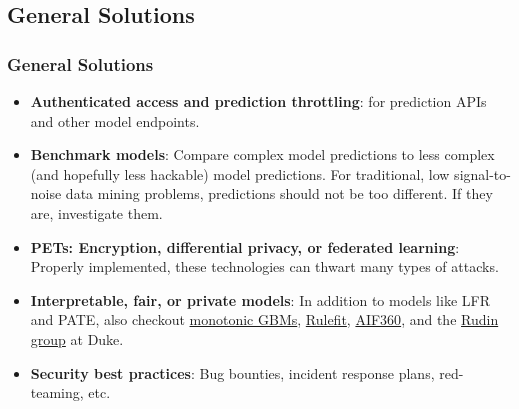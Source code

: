 \documentclass[11pt,
               aspectratio=169,
               hyperref={colorlinks}
               ]{beamer}
\begin{document}
		\subsection{General Solutions}
	
			\begin{frame}[t]	
		
				\frametitle{General Solutions}	
				\scriptsize
				\small
				\begin{itemize}
					\item \textbf{Authenticated access and prediction throttling}: for prediction APIs and other model endpoints.
					\item \textbf{Benchmark models}: Compare complex model predictions to less complex (and hopefully less hackable) model predictions. For traditional, low signal-to-noise data mining problems, predictions should not be too different. If they are, investigate them.
					\item \textbf{PETs: Encryption, differential privacy, or federated learning}: Properly implemented, these technologies can thwart many types of attacks.
					\item \textbf{Interpretable, fair, or private models}: In addition to models like LFR and PATE, also checkout \href{https://github.com/h2oai/h2o-3/blob/master/h2o-py/demos/H2O_tutorial_gbm_monotonicity.ipynb}{monotonic GBMs}, \href{https://christophm.github.io/interpretable-ml-book/rulefit.html}{Rulefit}, \href{https://github.com/IBM/AIF360}{AIF360}, and the \href{https://users.cs.duke.edu/~cynthia/code.html}{Rudin group} at Duke.
					\item \textbf{Security best practices}: Bug bounties, incident response plans, red-teaming, etc. 
				\end{itemize}
			\end{frame}
			
\end{document}
